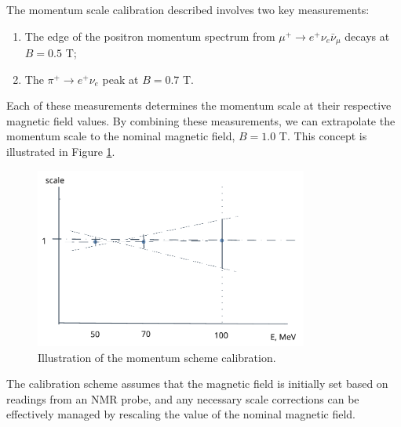 The momentum scale calibration described involves two key measurements: 
\begin{enumerate}
    \item The edge of the positron momentum spectrum from $\mu^+ \rightarrow e^+ \nu_e \bar{\nu}_\mu$ decays at $B = 0.5$ T;
    \item The $\pi^+ \rightarrow e^+ \nu_e$ peak at $B = 0.7$ T.
\end{enumerate}

Each of these measurements determines the momentum scale at their respective 
magnetic field values. By combining these measurements, we can extrapolate the 
momentum scale to the nominal magnetic field, $B = 1.0$ T. This concept is illustrated in Figure \ref{fig:momscale}.

\begin{figure}[h]
\centering
\includegraphics[width=0.8\textwidth]{figures/png/Screenshot_20240707_180742.png}
\caption{Illustration of the momentum scheme calibration.}
\label{fig:momscale}
\end{figure}

The calibration scheme assumes that the magnetic field is initially set based 
on readings from an NMR probe, and any necessary scale corrections can be 
effectively managed by rescaling the value of the nominal magnetic field.